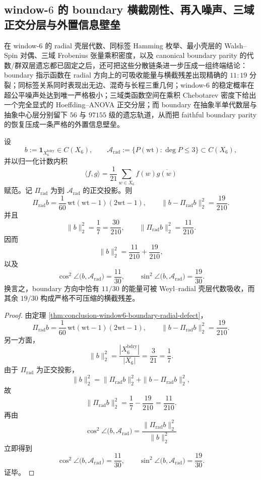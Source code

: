 \subsection{window-\texorpdfstring{$6$}{6} 的 boundary 横截刚性、再入噪声、三域正交分层与外置信息壁垒}\label{subsec:conclusion-window6-boundary-rigidity-reentry-anova-externality}
在 window-\(6\) 的 radial 壳层代数、同标签 Hamming 枚举、最小壳层的 Walsh--Spin 对偶、三域 Frobenius 张量乘积密度，以及 canonical boundary parity 的代数/群双层遗忘都已固定之后，还可把这些分散链条进一步压成一组终端结论：boundary 指示函数在 radial 方向上的可吸收能量与横截残差出现精确的 \(11{:}19\) 分裂；同标签关系同时表现出无边、混奇与长程三重几何；window-\(6\) 的稳定概率在超公平噪声处达到唯一严格极小；三域类函数空间在乘积 Chebotarev 密度下给出一个完全显式的 Hoeffding--ANOVA 正交分层；而 boundary 在抽象半单代数层与抽象中心层分别留下 \(56\) 与 \(97155\) 级的遗忘轨道，从而把 faithful boundary parity 的恢复压成一条严格的外置信息壁垒。

\begin{theorem}\label{thm:conclusion-window6-boundary-eleven-nineteen-orthogonal-splitting}
设
\[
b:=\mathbf 1_{X_6^{\mathrm{bdry}}}\in C(X_6),
\qquad
\mathcal A_{\mathrm{rad}}:=\{P(\mathrm{wt}):\deg P\le 3\}\subset C(X_6),
\]
并以归一化计数内积
\[
\langle f,g\rangle=\frac1{21}\sum_{w\in X_6}f(w)\overline{g(w)}
\]
赋范。记 \(\Pi_{\mathrm{rad}}\) 为到 \(\mathcal A_{\mathrm{rad}}\) 的正交投影。则
\[
\Pi_{\mathrm{rad}}b
=
\frac{1}{60}\,\mathrm{wt}(\mathrm{wt}-1)(2\mathrm{wt}-1),
\qquad
\|b-\Pi_{\mathrm{rad}}b\|_2^2=\frac{19}{210}.
\]
并且
\[
\|b\|_2^2=\frac17=\frac{30}{210},
\qquad
\|\Pi_{\mathrm{rad}}b\|_2^2=\frac{11}{210}.
\]
因而
\[
\|b\|_2^2=\frac{11}{210}+\frac{19}{210},
\]
以及
\[
\cos^2\angle\!\bigl(b,\mathcal A_{\mathrm{rad}}\bigr)=\frac{11}{30},
\qquad
\sin^2\angle\!\bigl(b,\mathcal A_{\mathrm{rad}}\bigr)=\frac{19}{30}.
\]
换言之，boundary 方向中恰有 \(11/30\) 的能量可被 Weyl--radial 壳层代数吸收，而其余 \(19/30\) 构成严格不可压缩的横截残差。
\end{theorem}
\begin{proof}
由定理 \ref{thm:conclusion-window6-boundary-radial-defect}，
\[
\Pi_{\mathrm{rad}}b
=
\frac{1}{60}\,\mathrm{wt}(\mathrm{wt}-1)(2\mathrm{wt}-1),
\qquad
\|b-\Pi_{\mathrm{rad}}b\|_2^2=\frac{19}{210}.
\]
另一方面，
\[
\|b\|_2^2
=
\frac{|X_6^{\mathrm{bdry}}|}{|X_6|}
=
\frac{3}{21}
=
\frac17.
\]
由于 \(\Pi_{\mathrm{rad}}\) 为正交投影，
\[
\|b\|_2^2
=
\|\Pi_{\mathrm{rad}}b\|_2^2+\|b-\Pi_{\mathrm{rad}}b\|_2^2,
\]
故
\[
\|\Pi_{\mathrm{rad}}b\|_2^2
=
\frac17-\frac{19}{210}
=
\frac{11}{210}.
\]
再由
\[
\cos^2\angle\!\bigl(b,\mathcal A_{\mathrm{rad}}\bigr)
=
\frac{\|\Pi_{\mathrm{rad}}b\|_2^2}{\|b\|_2^2}
\]
立即得到
\[
\cos^2\angle\!\bigl(b,\mathcal A_{\mathrm{rad}}\bigr)=\frac{11}{30},
\qquad
\sin^2\angle\!\bigl(b,\mathcal A_{\mathrm{rad}}\bigr)=\frac{19}{30}.
\]
证毕。
\end{proof}

